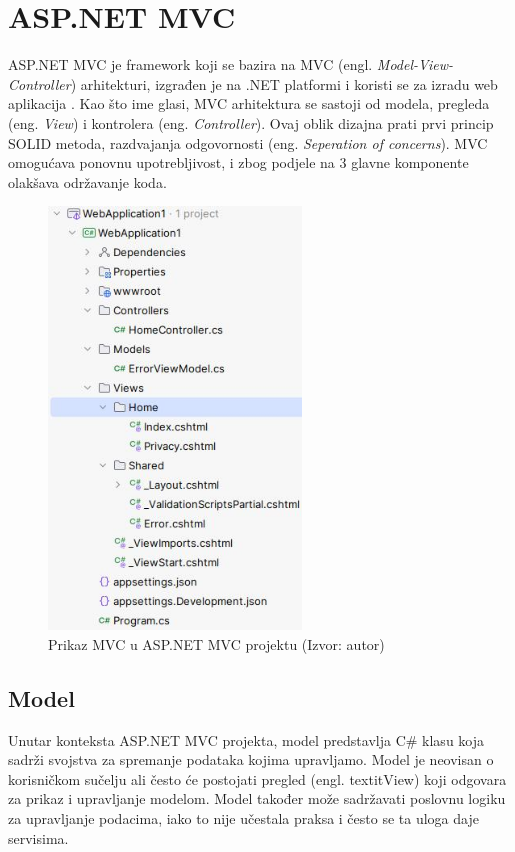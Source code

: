 \documentclass{foi}
\begin{document}
\section{ASP.NET MVC}
ASP.NET MVC je framework koji se bazira na MVC (engl. \textit{Model-View-Controller}) arhitekturi, izgrađen je na .NET platformi i koristi se za izradu web aplikacija \cite{Tyler2024}.
Kao što ime glasi, MVC arhitektura se sastoji od modela, pregleda (eng. \textit{View}) i kontrolera (eng. \textit{Controller}). Ovaj oblik dizajna prati prvi princip SOLID metoda, razdvajanja odgovornosti (eng. \textit{Seperation of concerns}).
MVC omogućava ponovnu upotrebljivost, i zbog podjele na 3 glavne komponente olakšava održavanje koda. \cite{GeeksforGeeks2024}
\begin{figure}[H]
    \centering
    \includegraphics[width=0.6\textwidth]{slike/MVC_project.jpeg}
    \caption{Prikaz MVC u ASP.NET MVC projektu (Izvor: autor)}
    \label{fig:mvc_projekt}
\end{figure}

\subsection{Model}
Unutar konteksta ASP.NET MVC projekta, model predstavlja C\# klasu koja sadrži svojstva za spremanje podataka kojima upravljamo. Model je neovisan o korisničkom sučelju ali često će postojati pregled (engl. textit{View}) koji odgovara za prikaz i upravljanje modelom.
Model također može sadržavati poslovnu logiku za upravljanje podacima, iako to nije učestala praksa i često se ta uloga daje servisima.
\end{document}
